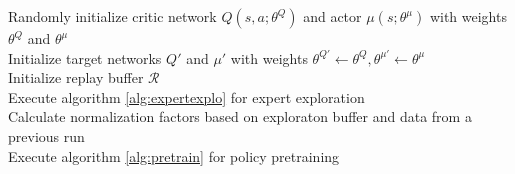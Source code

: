\documentclass[hyperref,german,beleg]{cgvpub}
\begin{document}
\begin{algorithm}
\SetAlgoLined
Randomly initialize critic network $Q(s, a;\theta^Q)$ and actor $\mu(s;\theta^{\mu})$ with weights $\theta^Q$ and $\theta^{\mu}$\\
Initialize target networks $Q'$ and $\mu'$ with weights $\theta^{Q'} \leftarrow \theta^Q, \theta^{\mu'} \leftarrow \theta^{\mu}$\\
Initialize replay buffer $\mathcal{R}$\\

Execute algorithm \ref{alg:expertexplo} for expert exploration \\
Calculate normalization factors based on exploraton buffer and data from a previous run \\
Execute algorithm \ref{alg:pretrain} for policy pretraining \\


\end{algorithm}
\end{document}
